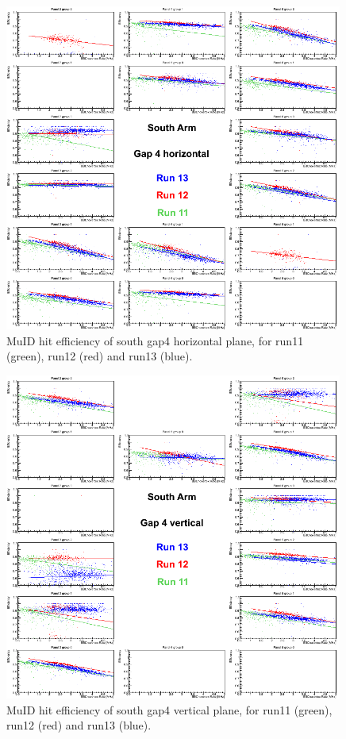 \begin{figure}[h!]

  \centering
  \includegraphics[width=0.99\textwidth]{./figures/efficomp_South_gap4_horizontal.png}
  \caption{\label{Fig:efficiency:MuIdEff:a0g4p0}MuID hit efficiency of south gap4 horizontal plane, for run11 (green), run12 (red) and run13 (blue).}
\end{figure}
\clearpage


\begin{figure}[h!]

  \centering
  \includegraphics[width=0.99\textwidth]{./figures/efficomp_South_gap4_vertical.png}
  \caption{\label{Fig:efficiency:MuIdEff:a0g4p1}MuID hit efficiency of south gap4 vertical plane, for run11 (green), run12 (red) and run13 (blue).}
\end{figure}
\clearpage


